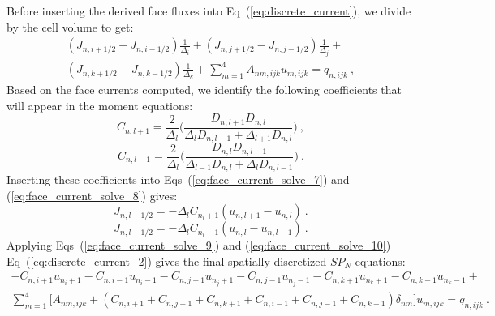 Before inserting the derived face fluxes into
Eq~(\ref{eq:discrete_current}), we divide by the cell volume to get:
\begin{multline}
(J_{n,i+1/2} - J_{n,i-1/2}) \frac{1}{\Delta_i} + (J_{n,j+1/2} -
  J_{n,j-1/2}) \frac{1}{\Delta_j} +\\ (J_{n,k+1/2} - J_{n,k-1/2})
  \frac{1}{\Delta_k} + \sum_{m=1}^4 A_{nm,ijk} u_{m,ijk} =
  q_{n,ijk}\:,
  \label{eq:discrete_current_2}
\end{multline}
Based on the face currents computed, we identify the following
coefficients that will appear in the moment equations:
\begin{equation}
  C_{n,l+1} = \frac{2}{\Delta_l}\Bigg( \frac{D_{n,l+1}
    D_{n,l}}{\Delta_l D_{n,l+1} + \Delta_{l+1} D_{n,l}}\Bigg)\:,
  \label{eq:moment_coeff_plus}
\end{equation}
\begin{equation}
  C_{n,l-1} = \frac{2}{\Delta_l}\Bigg( \frac{D_{n,l}
    D_{n,l-1}}{\Delta_{l-1} D_{n,l} + \Delta_{l} D_{n,l-1}}\Bigg)\:.
  \label{eq:moment_coeff_minus}
\end{equation}
Inserting these coefficients into Eqs~(\ref{eq:face_current_solve_7})
and (\ref{eq:face_current_solve_8}) gives:
\begin{equation}
  J_{n,l+1/2} = - \Delta_l C_{n_l+1} (u_{n,l+1} - u_{n,l})\:.
  \label{eq:face_current_solve_9}
\end{equation}
\begin{equation}
  J_{n,l-1/2} = - \Delta_l C_{n_l-1} (u_{n,l} - u_{n,l-1})\:.
  \label{eq:face_current_solve_10}
\end{equation}
Applying Eqs~(\ref{eq:face_current_solve_9}) and
(\ref{eq:face_current_solve_10}) Eq~(\ref{eq:discrete_current_2})
gives the final spatially discretized $SP_N$ equations:
\begin{multline}
  - C_{n,i+1} u_{n_i+1} - C_{n,i-1} u_{n_i-1} - C_{n,j+1} u_{n_j+1} -
  C_{n,j-1} u_{n_j-1} - C_{n,k+1} u_{n_k+1} - C_{n,k-1} u_{n_k-1} +\\
  \sum_{m=1}^4 \Big[A_{nm,ijk} +
    (C_{n,i+1}+C_{n,j+1}+C_{n,k+1}+C_{n,i-1}+C_{n,j-1}+C_{n,k-1})\delta_{nm}\Big]
  u_{m,ijk} = q_{n,ijk}\:.
  \label{eq:discrete_space_spn}
\end{multline}


